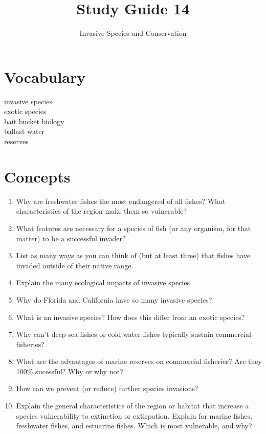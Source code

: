 \documentclass[letterpaper]{tufte-handout}
\title{Study Guide 14}
\author{Invasive Species and Conservation}
\date{} %
\begin{document}
\maketitle	%


\section{Vocabulary} 
\vspace{-1\baselineskip}
\begin{multicols}{2}
invasive species
\\
exotic species
\\
bait bucket biology
\\
ballast water
\\
reserves 
\end{multicols}

\section{Concepts}

\begin{enumerate}
	\item Why are freshwater fishes the most endangered of all fishes?  What characteristics of the region make them so vulnerable?
	
	\item What features are necessary for a species of fish (or any organism, for that matter) to be a successful invader?
	
	\item List as many ways as you can think of (but at least three) that fishes have invaded outside of their native range.
	
	\item Explain the many ecological impacts of invasive species.
	
	\item Why do Florida and California have so many invasive species?
	
	\item What is an invasive species?  How does this differ from an exotic species?
	
	\item Why can’t deep-sea fishes or cold water fishes typically sustain commercial fisheries?
	
	\item What are the advantages of marine reserves on commercial fisheries?  Are they 100\% sucessful? Why or why not?
	
	\item How can we prevent (or reduce) further species invasions?  
	
	\item Explain the general characteristics of the region or habitat that increase a species vulnerability to extinction or extirpation.  Explain for marine fishes, freshwater fishes, and estuarine fishes.  Which is most vulnerable, and why?
	
	
\end{enumerate}
\end{document}
